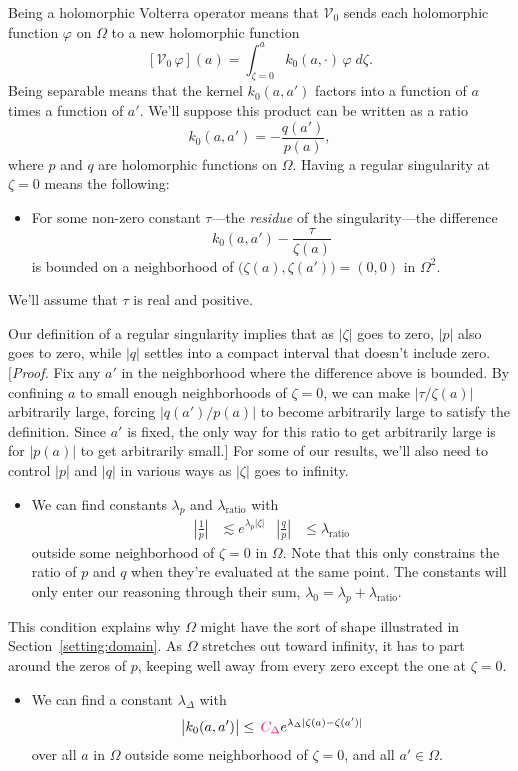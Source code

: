 \documentclass{article}
\makeatletter
\theoremstyle{plain}
\newcommand{\condconst}[2]{\item[($\text{\textsc{#1}} \mid #2$)]\protected@edef\@currentlabel{$\text{\textsc{#1}} \mid #2$}}
\newcommand{\hardpart}{\mathcal{V}_0}
\newcommand{\hardker}{k_0}
\newcommand{\domain}{\Omega}
\newenvironment{verify}{\color{ForestGreen}}{\color{black}}
\makeatother
\begin{document}
Being a holomorphic Volterra operator means that $\hardpart$ sends each holomorphic function $\varphi$ on $\domain$ to a new holomorphic function
\[ [\hardpart\,\varphi](a) = \int_{\zeta = 0}^a \hardker(a, \cdot)\,\varphi\;d\zeta. \]
Being separable means that the kernel $\hardker(a, a')$ factors into a function of $a$ times a function of $a'$. We'll suppose this product can be written as a ratio
\[ \hardker(a, a') = - \frac{q(a')}{p(a)}, \]
where $p$ and $q$ are holomorphic functions on $\domain$. Having a regular singularity at $\zeta = 0$ means the following:
\begin{itemize}
\condconst{sing}{\tau}\label{cond:sing} For some non-zero constant $\tau$---the {\em residue} of the singularity---the difference
\[ \hardker(a, a') - \frac{\tau}{\zeta(a)} \]
is bounded on a neighborhood of $\big(\zeta(a), \zeta(a')\big) = (0, 0)$ in $\domain^2$.
\end{itemize}
We'll assume that $\tau$ is real and positive.

Our definition of a regular singularity implies that as $|\zeta|$ goes to zero, $|p|$ also goes to zero, while $|q|$ settles into a compact interval that doesn't include zero.
\begin{verify}
[\textit{Proof.} Fix any $a'$ in the neighborhood where the difference above is bounded. By confining $a$ to small enough neighborhoods of $\zeta = 0$, we can make $|\tau/\zeta(a)|$ arbitrarily large, forcing $|q(a')/p(a)|$ to become arbitrarily large to satisfy the definition. Since $a'$ is fixed, the only way for this ratio to get arbitrarily large is for $|p(a)|$ to get arbitrarily small.]
\end{verify}
For some of our results, we'll also need to control $|p|$ and $|q|$ in various ways as $|\zeta|$ goes to infinity.
\begin{itemize}
\condconst{slow}{\lambda_0}\label{cond:slow} We can find constants $\lambda_p$ and $\lambda_\text{ratio}$ with
\begin{align*}
\left|\frac{1}{p}\right| & \lesssim e^{\lambda_p |\zeta|} &
\left|\frac{q}{p}\right| & \le \lambda_\text{ratio}
\end{align*}
outside some neighborhood of $\zeta = 0$ in $\Omega$. Note that this only constrains the ratio of $p$ and $q$ when they're evaluated at the same point. The constants will only enter our reasoning through their sum, $\lambda_0 = \lambda_p + \lambda_\text{ratio}$.
\end{itemize}
This condition explains why $\domain$ might have the sort of shape illustrated in Section~\ref{setting:domain}. As $\domain$ stretches out toward infinity, it has to part around the zeros of $p$, keeping well away from every zero except the one at $\zeta = 0$.
\begin{itemize}
\condconst{diag$_0$}{\lambda_\Delta}\label{cond:diag-basic} We can find a constant $\lambda_\Delta$ with
\[ \big| \hardker(a, a') \big| \leq \,  \textcolor{magenta}{C_\Delta} e^{\lambda_\Delta|\zeta(a)-\zeta(a')|} \]
over all $a$ in $\domain$ outside some neighborhood of $\zeta = 0$, and all $a' \in \domain$.
\end{itemize}
\end{document}

